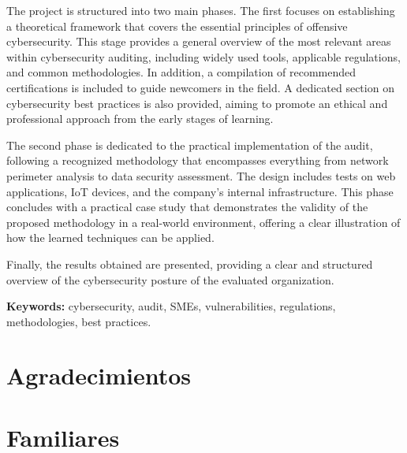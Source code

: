 \documentclass[a4paper, 11pt]{article}
\begin{document}
\par\vspace{0.5cm}

The project is structured into two main phases. The first focuses on establishing a theoretical framework that covers the essential principles of offensive cybersecurity. This stage provides a general overview of the most relevant areas within cybersecurity auditing, including widely used tools, applicable regulations, and common methodologies. In addition, a compilation of recommended certifications is included to guide newcomers in the field. A dedicated section on cybersecurity best practices is also provided, aiming to promote an ethical and professional approach from the early stages of learning.

\par\vspace{0.5cm}

The second phase is dedicated to the practical implementation of the audit, following a recognized methodology that encompasses everything from network perimeter analysis to data security assessment. The design includes tests on web applications, IoT devices, and the company’s internal infrastructure. This phase concludes with a practical case study that demonstrates the validity of the proposed methodology in a real-world environment, offering a clear illustration of how the learned techniques can be applied.

\par\vspace{0.5cm}

Finally, the results obtained are presented, providing a clear and structured overview of the cybersecurity posture of the evaluated organization.
\par\vspace{0.5cm}
\textbf{Keywords:} cybersecurity, audit, SMEs, vulnerabilities, regulations, methodologies, best practices.
\clearpage


\thispagestyle{nohead}

\section*{Agradecimientos}
\section*{Familiares}
\end{document}
